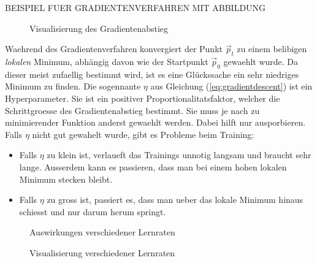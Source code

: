 \documentclass[../main]{subfiles}
\begin{document}
BEISPIEL FUER GRADIENTENVERFAHREN MIT ABBILDUNG

\begin{figure}[h!]
  \centering

  \caption{Visualisierung des Gradientenabstieg}
\end{figure}

Waehrend des Gradientenverfahren konvergiert der Punkt $\vec{p}_t$ zu einem belibigen \textit{lokalen} Minimum, abhängig davon wie der Startpunkt $\vec{p}_0$ gewaehlt wurde.
Da dieser meist zufaellig bestimmt wird, ist es eine Glückssache ein sehr niedriges Minimum zu finden.
\para{}
Die sogennante  $\eta$ aus Gleichung (\ref{eq:gradientdescent}) ist ein Hyperparameter.
Sie ist ein positiver Proportionalitatsfaktor, welcher die Schrittgroesse des Gradientenabstieg bestimmt. Sie muss je nach zu minimierender Funktion anderst gewaehlt werden.
Dabei hilft nur ausporbieren. Falls $\eta$ nicht gut gewahelt wurde, gibt es Probleme beim Training:
\begin{itemize}
\item{Falls $\eta$ zu klein ist, verlaueft das Trainings unnotig langsam und braucht sehr lange.
    Ausserdem kann es passieren, dass man bei einem hohen lokalen Minimum stecken bleibt.}

\item{Falls $\eta$ zu gross ist, passiert es, dass man ueber das lokale Minimum hinaus schiesst und nur darum herum springt.}
\end{itemize}

\begin{figure}[h!]
  \centering
  \caption{Auswirkungen verschiedener Lernraten}
\end{figure}

\begin{figure}[h!]
  \centering
  \caption{Visualisierung verschiedener Lernraten}
\end{figure}
\end{document}
